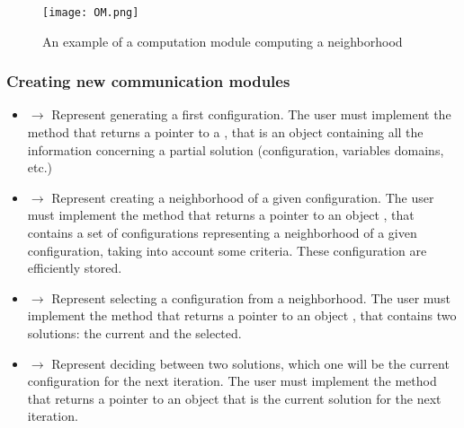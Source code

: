 \begin{figure}
	\centering	
	\texttt{[image: OM.png]}
	\caption{An example of a computation module computing a neighborhood}\label{fig:om}
\end{figure}

\subsubsection{Creating new communication modules}
\label{subsubsec:creatingoms}


\begin{itemize}
\item {} $\rightarrow$ Represent \oms{} generating a first configuration. The user must implement the method  that returns a pointer to a , that is an object containing all the information concerning a partial solution (configuration, variables domains, etc.)
\item {} $\rightarrow$ Represent \oms{} creating a neighborhood of a given configuration. The user must implement the method  that returns a pointer to an object , that contains a set of configurations representing a neighborhood of a given configuration, taking into account some criteria. These configuration are efficiently stored.
\item {} $\rightarrow$ Represent \oms{} selecting a configuration from a neighborhood. The user must implement the method  that returns a pointer to an object , that contains two solutions: the current and the selected.
\item {} $\rightarrow$ Represent \oms{} deciding between two solutions, which one will be the current configuration for the next iteration. The user must implement the method  that returns a pointer to an object  that is the current solution for the next iteration.
\end{itemize}

